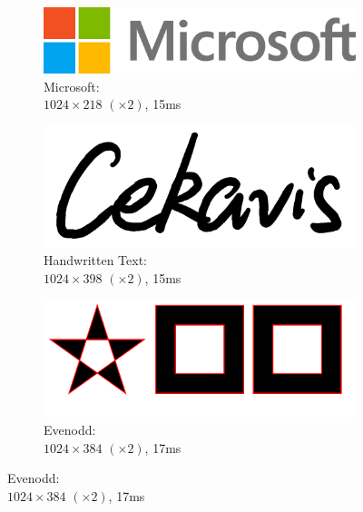 \documentclass[UTF8]{ctexart}
\begin{document}
\begin{figure}[H]
\begin{subfigure}[b]{0.45\textwidth}
    \end{subfigure}
    \par\bigskip
    \begin{subfigure}[b]{0.45\textwidth}
        \centering
        \includegraphics[width=\textwidth]{images/Microsoft-1024x218-x2-15ms.png}
        \caption{Microsoft: \\$1024 \times 218$ $(\times 2)$, 15ms}
    \end{subfigure}
    \hfill
    \begin{subfigure}[b]{0.45\textwidth}
        \centering
        \includegraphics[width=\textwidth]{images/Handwritten Text-1024x398-x2-15ms.png}
        \caption{Handwritten Text: \\$1024 \times 398$ $(\times 2)$, 15ms}
    \end{subfigure}
    \par\bigskip
    \begin{subfigure}[b]{0.45\textwidth}
        \centering
        \includegraphics[width=\textwidth]{images/Evenodd-1024x384-x2-17ms.png}
        \caption{Evenodd: \\$1024 \times 384$ $(\times 2)$, 17ms}
    \end{subfigure}
    \hfill

\end{figure}
\end{document}
